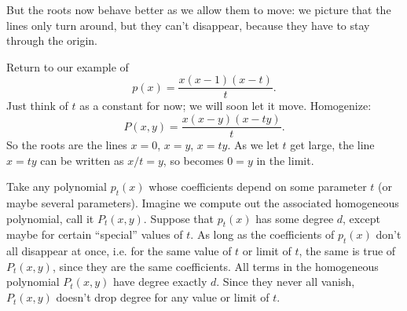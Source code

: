 But the roots now behave better as we allow them to move: we picture that the lines only turn around, but they can't disappear, because they have to stay through the origin.
\begin{example}
Return to our example of 
\[
p(x)=\frac{x(x-1)(x-t)}{t}.
\]
Just think of \(t\) as a constant for now; we will soon let it move.
Homogenize:
\[
P(x,y)=\frac{x(x-y)(x-ty)}{t}.
\]
So the roots are the lines \(x=0\), \(x=y\), \(x=ty\).
As we let \(t\) get large, the line \(x=ty\) can be written as \(x/t=y\), so becomes \(0=y\) in the limit.
\end{example}
Take any polynomial \(p_t(x)\) whose coefficients depend on some parameter \(t\) (or maybe several parameters).
Imagine we compute out the associated homogeneous polynomial, call it \(P_t(x,y)\).
Suppose that \(p_t(x)\) has some degree \(d\), except maybe for certain ``special'' values of \(t\).
As long as the coefficients of \(p_t(x)\) don't all disappear at once, i.e. for the same value of \(t\) or limit of \(t\), the same is true of \(P_t(x,y)\), since they are the same coefficients.
All terms in the homogeneous polynomial \(P_t(x,y)\) have degree exactly \(d\).
Since they never all vanish, \(P_t(x,y)\) doesn't drop degree for any value or limit of \(t\).

